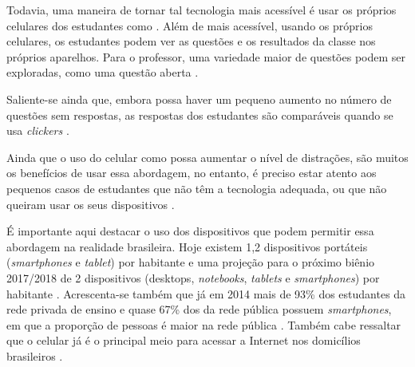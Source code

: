 Todavia, uma maneira de tornar tal tecnologia mais acessível é usar os próprios
celulares dos estudantes como {\clickers} \cite{Stowell2015, Morrell2015, Araujo2013}.
Além de mais acessível, usando os próprios celulares, os estudantes podem
ver as questões e os resultados da classe nos próprios aparelhos. Para o professor,
uma variedade maior de questões podem ser exploradas, como uma  questão aberta \cite{Stowell2015}.

Saliente-se ainda que, embora possa haver um pequeno aumento no número de questões
sem respostas, as respostas dos estudantes são comparáveis quando se usa
\textit{clickers} \cite{Morrell2015, Stowell2015}.

Ainda que o uso do celular como {\clicker} possa aumentar o nível de
distrações, são muitos os benefícios de usar essa abordagem, no entanto,
é preciso estar atento aos pequenos casos de estudantes que não têm a tecnologia
adequada, ou que não queiram usar os seus dispositivos \cite{Morrell2015, Stowell2015}.

É importante aqui destacar o uso dos dispositivos que podem permitir essa abordagem
na realidade brasileira. Hoje existem 1,2 dispositivos portáteis
(\textit{smartphones} e \textit{tablet}) por habitante e uma projeção para o próximo
biênio 2017/2018 de 2 dispositivos
(desktops, \textit{notebooks}, \textit{tablets} e \textit{smartphones}) por habitante \cite[p. 8]{Meirelles2016}.
Acrescenta-se também que já em 2014 mais de 93\% dos estudantes da rede privada de
ensino e quase 67\% dos da rede pública possuem \textit{smartphones}, em que a
proporção de pessoas é maior na rede pública \cite[p. 55]{IBGE2016}. Também cabe
ressaltar que o celular já é o principal meio para acessar a Internet nos domicílios
brasileiros \cite[p. 41]{IBGE2016}.



